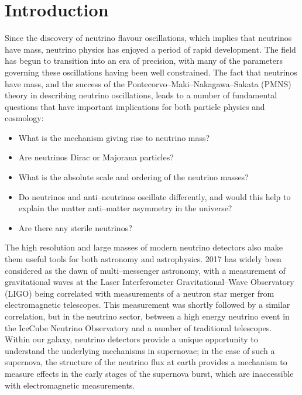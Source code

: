 \chapter{\label{ch:intro}Introduction} 

\minitoc

Since the discovery of neutrino flavour oscillations, which implies that
neutrinos have mass, neutrino physics has enjoyed a period of rapid development.
The field has begun to transition into an era of precision, with many of the
parameters governing these oscillations having been well constrained. The fact
that neutrinos have mass, and the success of the
Pontecorvo--Maki--Nakagawa--Sakata (PMNS) theory in describing neutrino 
oscillations, leads to a number of fundamental questions that have important 
implications for both particle physics and cosmology: 
\begin{itemize}
	\item What is the mechanism giving rise to neutrino mass? 
	\item Are neutrinos Dirac or Majorana particles?
	\item What is the absolute scale and ordering of the neutrino masses?
	\item Do neutrinos and anti--neutrinos oscillate differently, and would this 
	      help to explain the matter anti--matter asymmetry in the universe?
	\item Are there any sterile neutrinos?
\end{itemize}

\noindent
The high resolution and large masses of modern neutrino detectors also
make them useful tools for both astronomy and astrophysics. 2017 has widely 
been considered as the dawn of multi--messenger astronomy, with a measurement 
of gravitational waves at the Laser Interferometer Gravitational--Wave 
Observatory (LIGO) being correlated with measurements of a neutron star merger 
from electromagnetic telescopes\cite{Abbott2017}. This measurement was 
shortly followed by a similar correlation, but in the neutrino sector, between a
high energy neutrino event in the IceCube Neutrino Observatory and a number of 
traditional telescopes\cite{Aartsen2018}. Within our galaxy, neutrino 
detectors provide a unique opportunity to understand the underlying mechanisms 
in supernovae; in the case of such a supernova, the structure of the neutrino 
flux at earth provides a mechanism to measure effects in the early stages of 
the supernova burst, which are inaccessible with electromagnetic 
measurements\cite{Scholberg:2012id}.

